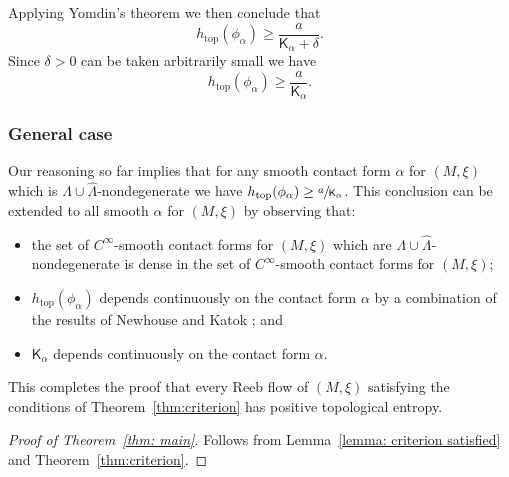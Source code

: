 \documentclass[10pt]{amsart}
\renewcommand{\top}{\mathrm{top}}
\theoremstyle{plain}
\theoremstyle{definition}
\numberwithin{equation}{subsection}
\begin{document}
Applying Yomdin's theorem \cite{Yomdin} we then conclude that
\begin{equation}
h_{\top}(\phi_\alpha) \geq \frac{a}{\mathsf{K}_\alpha + \delta}.
\end{equation}
Since $\delta>0$ can be taken arbitrarily small we have
\begin{equation}
h_{\top}(\phi_\alpha) \geq \frac{a}{\mathsf{K}_\alpha}.
\end{equation}

\subsubsection*{General case}
Our reasoning so far implies that for any smooth contact form $\alpha$ for $(M,\xi)$ which is $\Lambda\cup\widehat{\Lambda}$-nondegenerate we have $h_{\top}(\phi_\alpha) \geq \sfrac{a}{\mathsf{K}_\alpha}$. This conclusion can be extended to all smooth $\alpha$ for $(M,\xi)$ by observing that:
\begin{itemize}
\item the set of $C^\infty$-smooth contact forms for $(M,\xi)$ which are $\Lambda\cup\widehat{\Lambda}$-nondegenerate is dense in the set of $C^\infty$-smooth contact forms for $(M,\xi)$;
\item $h_{\top}(\phi_\alpha)$ depends continuously on the contact form $\alpha$ by a combination of the results of Newhouse \cite{New} and Katok \cite{Katok}; and
\item $\mathsf{K}_\alpha$ depends continuously on the contact form $\alpha$.
\end{itemize}

This completes the proof that every Reeb flow of $(M,\xi)$ satisfying the conditions of Theorem~\ref{thm:criterion} has positive topological entropy.

\begin{proof}[Proof of Theorem~\ref{thm: main}]
Follows from Lemma~\ref{lemma: criterion satisfied} and Theorem~\ref{thm:criterion}.
\end{proof}
\end{document}
